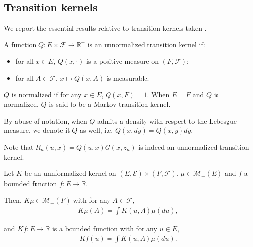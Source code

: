 \subsection{Transition kernels}
We report the essential results relative to transition kernels taken \cite{cappehmm}.
\begin{definition}\label{def:transition-kernel}
A function $Q:E \times \mathcal F \to \mathbb R^+$ is an unnormalized transition kernel if:
\begin{itemize}
    \item for all $x\in E$, $Q(x, \cdot)$ is a positive measure on $(F, \mathcal F)$;
    \item for all $A\in \mathcal F$, $x\mapsto Q(x, A)$ is measurable.
\end{itemize}
$Q$ is normalized if for any $x\in E$, $Q(x, F)=1$. When $E=F$ and $Q$ is normalized, $Q$ is said to be a Markov transition kernel.

By abuse of notation, when $Q$ admits a density with respect to the Lebesgue measure, we denote it $Q$ as well, i.e. $Q(x, dy)=Q(x, y)dy$.
\end{definition}

Note that $R_n(u, x)= Q(u, x)G(x, z_n)$ is indeed an unnormalized transition kernel.

\begin{definition}
    Let $K$ be an unnformalized kernel on $(E, \mathcal E)\times (F, \mathcal F)$, $\mu\in\mathcal M_+(E)$ and $f$ a bounded function $f:E\to\mathbb R$.

    Then, $K\mu\in\mathcal M_+(F)$ with for any $A\in\mathcal F$,
    \begin{align}
        K\mu(A) = \int K(u, A)\mu(du),
    \end{align}

    and $Kf: E \to \mathbb R$ is a bounded function with for any $u\in E$,
    \begin{align}
        Kf(u) = \int K(u, A)\mu(du).
    \end{align}
\end{definition}
